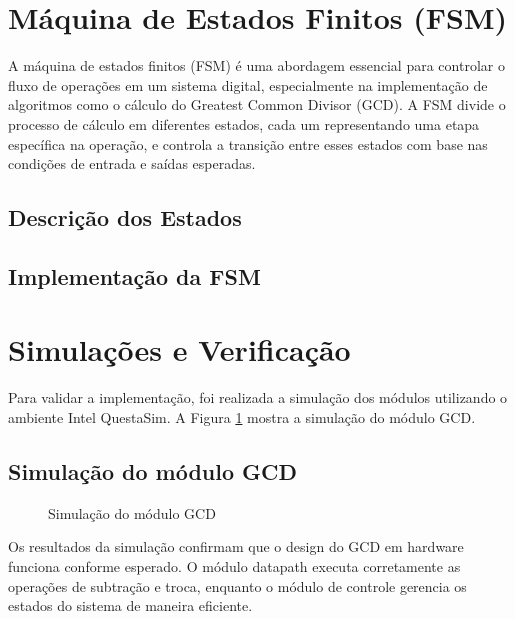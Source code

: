 \documentclass[a4paper,11pt]{article} %
\begin{document}
\section{Máquina de Estados Finitos (FSM)}
A máquina de estados finitos (FSM) é uma abordagem essencial
para controlar o fluxo de operações em um sistema digital, 
especialmente na implementação de algoritmos como o cálculo
do Greatest Common Divisor (GCD). A FSM divide o processo 
de cálculo em diferentes estados, cada um representando uma
etapa específica na operação, e controla a transição entre
esses estados com base nas condições de entrada e saídas
esperadas.

\subsection{Descrição dos Estados}

\subsection{Implementação da FSM}

\section{Simulações e Verificação}

Para validar a implementação, foi realizada a simulação dos módulos utilizando o ambiente Intel QuestaSim. A Figura \ref{fig:simulacao} mostra a simulação do módulo GCD.

\subsection{Simulação do módulo GCD}
\begin{figure}[ht]
    \centering
    \caption{Simulação do módulo GCD}
    \label{fig:simulacao}
\end{figure}

Os resultados da simulação confirmam que o design do GCD em hardware funciona conforme esperado. O módulo datapath executa corretamente as operações de subtração e troca, enquanto o módulo de controle gerencia os estados do sistema de maneira eficiente.
\end{document}
